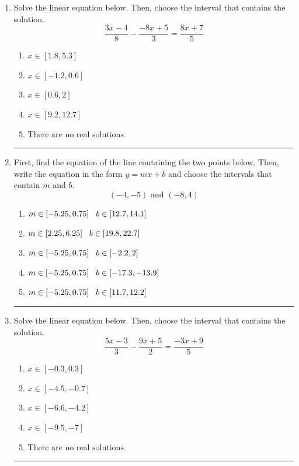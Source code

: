 \documentclass[14pt]{extbook}
\newcommand{\litem}[1]{\item#1\hspace*{-1cm}\rule{\textwidth}{0.4pt}}
\begin{document}
\begin{enumerate}
{\begin{enumerate}[label=\Alph*.]
\end{enumerate} }
\litem{
Solve the linear equation below. Then, choose the interval that contains the solution.\[ \frac{3x -4}{8} - \frac{-8x + 5}{3} = \frac{8x + 7}{5} \]\begin{enumerate}[label=\Alph*.]
\item \( x \in [1.8, 5.3] \)
\item \( x \in [-1.2, 0.6] \)
\item \( x \in [0.6, 2] \)
\item \( x \in [9.2, 12.7] \)
\item \( \text{There are no real solutions.} \)

\end{enumerate} }
\litem{
First, find the equation of the line containing the two points below. Then, write the equation in the form $ y=mx+b $ and choose the intervals that contain $m$ and $b$.\[ (-4, -5) \text{ and } (-8, 4) \]\begin{enumerate}[label=\Alph*.]
\item \( m \in [-5.25, 0.75] \hspace*{3mm} b \in [12.7, 14.1] \)
\item \( m \in [2.25, 6.25] \hspace*{3mm} b \in [19.8, 22.7] \)
\item \( m \in [-5.25, 0.75] \hspace*{3mm} b \in [-2.2, 2] \)
\item \( m \in [-5.25, 0.75] \hspace*{3mm} b \in [-17.3, -13.9] \)
\item \( m \in [-5.25, 0.75] \hspace*{3mm} b \in [11.7, 12.2] \)

\end{enumerate} }
\litem{
Solve the linear equation below. Then, choose the interval that contains the solution.\[ \frac{5x -3}{3} - \frac{9x + 5}{2} = \frac{-3x + 9}{5} \]\begin{enumerate}[label=\Alph*.]
\item \( x \in [-0.3, 0.3] \)
\item \( x \in [-4.5, -0.7] \)
\item \( x \in [-6.6, -4.2] \)
\item \( x \in [-9.5, -7] \)
\item \( \text{There are no real solutions.} \)


\end{enumerate}}
\end{enumerate}
\end{document}
